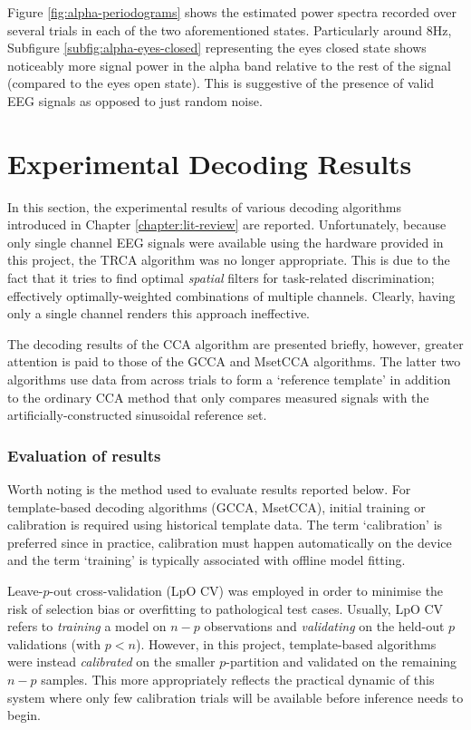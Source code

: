 Figure \ref{fig:alpha-periodograms} shows the estimated power spectra recorded over several trials in each of the two aforementioned states. Particularly around 8Hz, Subfigure \ref{subfig:alpha-eyes-closed} representing the eyes closed state shows noticeably more signal power in the alpha band relative to the rest of the signal (compared to the eyes open state). This is suggestive of the presence of valid EEG signals as opposed to just random noise.

\section{Experimental Decoding Results}
In this section, the experimental results of various decoding algorithms introduced in Chapter \ref{chapter:lit-review} are reported. Unfortunately, because only single channel EEG signals were available using the hardware provided in this project, the TRCA algorithm was no longer appropriate. This is due to the fact that it tries to find optimal \textit{spatial} filters for task-related discrimination; effectively optimally-weighted combinations of multiple channels. Clearly, having only a single channel renders this approach ineffective. 

The decoding results of the CCA algorithm are presented briefly, however, greater attention is paid to those of the GCCA and MsetCCA algorithms. The latter two algorithms use data from across trials to form a `reference template' in addition to the ordinary CCA method that only compares measured signals with the artificially-constructed sinusoidal reference set. 

\subsubsection{Evaluation of results}
Worth noting is the method used to evaluate results reported below. For template-based decoding algorithms (GCCA, MsetCCA), initial training or calibration is required using historical template data. The term `calibration' is preferred since in practice, calibration must happen automatically on the device and the term `training' is typically associated with offline model fitting.

Leave-$p$-out cross-validation (LpO CV) was employed in order to minimise the risk of selection bias or overfitting to pathological test cases. Usually, LpO CV refers to \textit{training} a model on $n-p$ observations and \textit{validating} on the held-out $p$ validations (with $p<n$). However, in this project, template-based algorithms were instead \textit{calibrated} on the smaller $p$-partition and validated on the remaining $n-p$ samples. This more appropriately reflects the practical dynamic of this system where only few calibration trials will be available before inference needs to begin.

